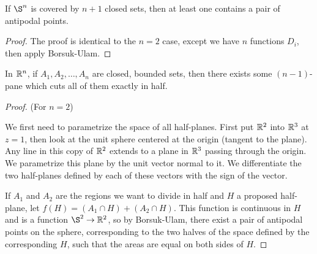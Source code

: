 
\begin{theorem}
	If $\S^n$ is covered by $n+1$ closed sets, then at least one contains a pair of antipodal points.
\end{theorem}
\begin{proof}
	The proof is identical to the $n=2$ case, except we have $n$ functions $D_i$, then apply Borsuk-Ulam.
\end{proof}

\begin{theorem}
	In $\mathbb{R}^n$, if $A_1,A_2,\dots,A_n$ are closed, bounded sets, then there exists some $(n-1)$-pane which cuts all of them exactly in half.
\end{theorem}
\begin{proof}
	(For $n=2$)
	
	We first need to parametrize the space of all half-planes.  First put $\mathbb{R}^2$ into $\mathbb{R}^3$ at $z=1$, then look at the unit sphere centered at the origin (tangent to the plane).  Any line in this copy of $\mathbb{R}^2$ extends to a plane in $\mathbb{R}^3$ passing through the origin.  We parametrize this plane by the unit vector normal to it.  We differentiate the two half-planes defined by each of these vectors with the sign of the vector.
	
	If $A_1$ and $A_2$ are the regions we want to divide in half and $H$ a proposed half-plane, let $f(H)=(A_1\cap H)+(A_2\cap H)$.  This function is continuous in $H$ and is a function $\S^2\rightarrow \R^2$, so by Borsuk-Ulam, there exist a pair of antipodal points on the sphere, corresponding to the two halves of the space defined by the corresponding $H$, such that the areas are equal on both sides of $H$.
\end{proof}
